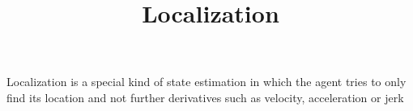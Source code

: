 \documentclass[a4paper]{article}
\title{Localization}
\date{}
\begin{document}
    \maketitle
    Localization is a special kind of state estimation in which the agent tries to only find its location and not further derivatives such as velocity, acceleration or jerk
\end{document}
